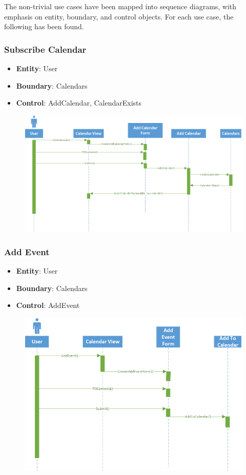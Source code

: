 The non-trivial use cases have been mapped into sequence diagrams, with emphasis
on entity, boundary, and control objects. For each use case, the following has
been found.

\subsubsection{Subscribe Calendar}
\begin{itemize}
\item \textbf{Entity}: User
\item \textbf{Boundary}: Calendars
\item \textbf{Control}: AddCalendar, CalendarExists
\end{itemize}

\begin{figure}[h]
\includegraphics[scale=0.8]{subscribe.png}
\end{figure}

\subsubsection{Add Event}
\begin{itemize}
\item \textbf{Entity}: User
\item \textbf{Boundary}: Calendars
\item \textbf{Control}: AddEvent
\end{itemize}

\clearpage
\begin{figure}[h]
\includegraphics[scale=0.8]{addevent.png}
\end{figure}

